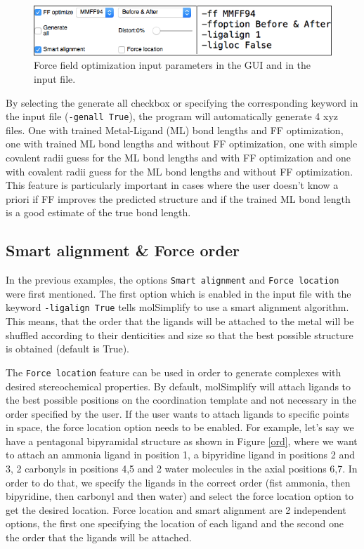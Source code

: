 \documentclass[a4paper,12pt]{assignment}
\begin{document}
\begin{figure}[htb!]
\centering
\includegraphics[width=\textwidth]{./Figures/fig3.png}
\caption{Force field optimization input parameters in the GUI and in the input file.}
\label{ffopt}
\end{figure}

By selecting the generate all checkbox or specifying the corresponding keyword in the input file (\texttt{-genall True}), the program will automatically generate 4 xyz files. One with trained Metal-Ligand (ML) bond lengths and FF optimization, one with trained ML bond lengths and without FF optimization, one with simple covalent radii guess for the ML bond lengths and with FF optimization and one with covalent radii guess for the ML bond lengths and without FF optimization. This feature is particularly important in cases where the user doesn't know a priori if FF improves the predicted structure and if the trained ML bond length is a good estimate of the true bond length.



\subsection{Smart alignment \& Force order}\label{force}

In the previous examples, the options \texttt{Smart alignment} and \texttt{Force location} were first mentioned. The first option which is enabled in the input file with the keyword \texttt{-ligalign True} tells molSimplify to use a smart alignment algorithm. This means, that the order that the ligands will be attached to the metal will be shuffled according to their denticities and size so that the best possible structure is obtained (default is True).

The \texttt{Force location} feature can be used in order to generate complexes with desired stereochemical properties. By default, molSimplify will attach ligands to the best possible positions on the coordination template and not necessary in the order specified by the user. If the user wants to attach ligands to specific points in space, the force location option needs to be enabled. For example, let's say we have a pentagonal bipyramidal structure as shown in Figure \ref{ord}, where we want to attach an ammonia ligand in position 1, a bipyridine ligand in positions 2 and 3, 2 carbonyls in positions 4,5 and 2 water molecules in the axial positions 6,7. In order to do that, we specify the ligands in the correct order (fist ammonia, then bipyridine, then carbonyl and then water) and select the force location option to get the desired location. Force location and smart alignment are 2 independent options, the first one specifying the location of each ligand and the second one the order that the ligands will be attached.
\end{document}
